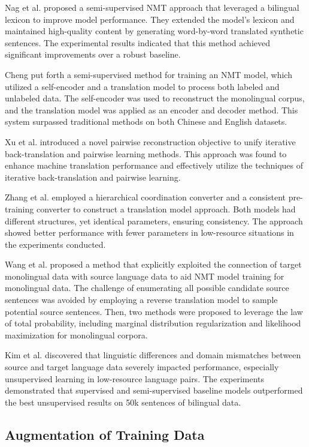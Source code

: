 \documentclass[acmsmall]{acmart}
\begin{document}
Nag et al. \cite{n4-79} proposed a semi-supervised NMT approach that leveraged a bilingual lexicon to improve model performance. They extended the model's lexicon and maintained high-quality content by generating word-by-word translated synthetic sentences. The experimental results indicated that this method achieved significant improvements over a robust baseline. 

Cheng\cite{n4-80} put forth a semi-supervised method for training an NMT model, which utilized a self-encoder and a translation model to process both labeled and unlabeled data. The self-encoder was used to reconstruct the monolingual corpus, and the translation model was applied as an encoder and decoder method. This system surpassed traditional methods on both Chinese and English datasets. 

Xu et al. \cite{n4-81} introduced a novel pairwise reconstruction objective to unify iterative back-translation and pairwise learning methods. This approach was found to enhance machine translation performance and effectively utilize the techniques of iterative back-translation and pairwise learning. 

Zhang et al. \cite{n4-82} employed a hierarchical coordination converter and a consistent pre-training converter to construct a translation model approach. Both models had different structures, yet identical parameters, ensuring consistency. The approach showed better performance with fewer parameters in low-resource situations in the experiments conducted. 

Wang et al. \cite{n4-83} proposed a method that explicitly exploited the connection of target monolingual data with source language data to aid NMT model training for monolingual data. The challenge of enumerating all possible candidate source sentences was avoided by employing a reverse translation model to sample potential source sentences. Then, two methods were proposed to leverage the law of total probability, including marginal distribution regularization and likelihood maximization for monolingual corpora. 

Kim et al. \cite{n4-84} discovered that linguistic differences and domain mismatches between source and target language data severely impacted performance, especially unsupervised learning in low-resource language pairs. The experiments demonstrated that supervised and semi-supervised baseline models outperformed the best unsupervised results on 50k sentences of bilingual data. 

\subsection{Augmentation of Training Data}
\end{document}
